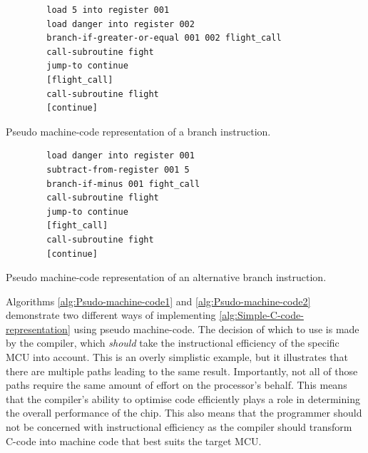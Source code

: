       \begin{algorithm}
        \begin{lstlisting}
        load 5 into register 001
        load danger into register 002
        branch-if-greater-or-equal 001 002 flight_call
        call-subroutine fight
        jump-to continue
        [flight_call]
        call-subroutine flight
        [continue]
        \end{lstlisting}
        \caption{\label{alg:Psudo-machine-code1}Pseudo machine-code representation
        of a branch instruction.}
      \end{algorithm}

      \begin{algorithm}
        \begin{lstlisting}
        load danger into register 001
        subtract-from-register 001 5
        branch-if-minus 001 fight_call
        call-subroutine flight
        jump-to continue
        [fight_call]
        call-subroutine fight
        [continue]
        \end{lstlisting}
        \caption{\label{alg:Psudo-machine-code2}Pseudo machine-code representation of an alternative branch instruction.}
      \end{algorithm}


      Algorithms \ref{alg:Psudo-machine-code1} and \ref{alg:Psudo-machine-code2} demonstrate two different ways of implementing \ref{alg:Simple-C-code-representation} using pseudo machine-code.
      The decision of which to use is made by the compiler, which \emph{should} take the instructional efficiency of the specific MCU into account.
      This is an overly simplistic example, but it illustrates that there are multiple paths leading to the same result.
      Importantly, not all of those paths require the same amount of effort on the processor's behalf.
      This means that the compiler's ability to optimise code efficiently plays a role in determining the overall performance of the chip.
      This also means that the programmer should not be concerned with instructional efficiency as the compiler should transform C-code into machine code that best suits the target MCU.

